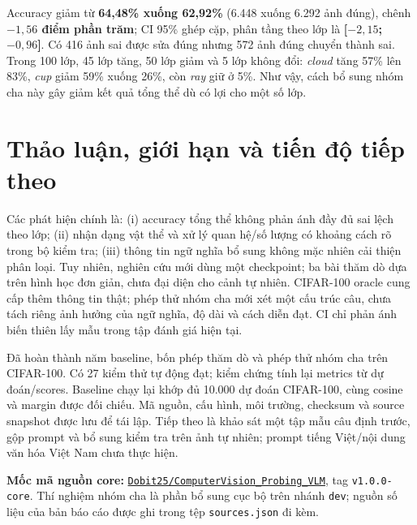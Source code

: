 \documentclass[11pt,a4paper]{article}
\begin{document}
Accuracy giảm từ \textbf{64,48\% xuống 62,92\%} (6.448 xuống 6.292 ảnh đúng), chênh \textbf{$-1,56$ điểm phần trăm}; CI 95\% ghép cặp, phân tầng theo lớp là \textbf{[$-2,15$; $-0,96$]}. Có 416 ảnh sai được sửa đúng nhưng 572 ảnh đúng chuyển thành sai. Trong 100 lớp, 45 lớp tăng, 50 lớp giảm và 5 lớp không đổi: \emph{cloud} tăng 57\% lên 83\%, \emph{cup} giảm 59\% xuống 26\%, còn \emph{ray} giữ ở 5\%. Như vậy, cách bổ sung nhóm cha này gây giảm kết quả tổng thể dù có lợi cho một số lớp.

\section{Thảo luận, giới hạn và tiến độ tiếp theo}
Các phát hiện chính là: (i) accuracy tổng thể không phản ánh đầy đủ sai lệch theo lớp; (ii) nhận dạng vật thể và xử lý quan hệ/số lượng có khoảng cách rõ trong bộ kiểm tra; (iii) thông tin ngữ nghĩa bổ sung không mặc nhiên cải thiện phân loại. Tuy nhiên, nghiên cứu mới dùng một checkpoint; ba bài thăm dò dựa trên hình học đơn giản, chưa đại diện cho cảnh tự nhiên. CIFAR-100 oracle cung cấp thêm thông tin thật; phép thử nhóm cha mới xét một cấu trúc câu, chưa tách riêng ảnh hưởng của ngữ nghĩa, độ dài và cách diễn đạt. CI chỉ phản ánh biến thiên lấy mẫu trong tập đánh giá hiện tại.

Đã hoàn thành năm baseline, bốn phép thăm dò và phép thử nhóm cha trên CIFAR-100. Có 27 kiểm thử tự động đạt; kiểm chứng tính lại metrics từ dự đoán/scores. Baseline chạy lại khớp đủ 10.000 dự đoán CIFAR-100, cùng cosine và margin được đối chiếu. Mã nguồn, cấu hình, môi trường, checksum và source snapshot được lưu để tái lập. Tiếp theo là khảo sát một tập mẫu câu định trước, gộp prompt và bổ sung kiểm tra trên ảnh tự nhiên; prompt tiếng Việt/nội dung văn hóa Việt Nam chưa thực hiện.

{\small\textbf{Mốc mã nguồn core:} \href{https://github.com/Dobit25/ComputerVision_Probing_VLM/tree/v1.0.0-core}{\texttt{Dobit25/ComputerVision\_Probing\_VLM}}, tag \texttt{v1.0.0-core}. Thí nghiệm nhóm cha là phần bổ sung cục bộ trên nhánh \texttt{dev}; nguồn số liệu của bản báo cáo được ghi trong tệp \texttt{sources.json} đi kèm.}
\end{document}
